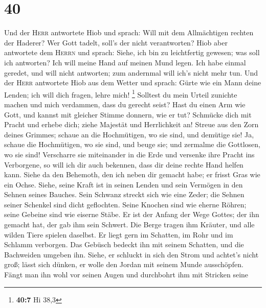 \hypertarget{section-10}{%
\section{40}\label{section-10}}

 Und der \textsc{Herr} antwortete Hiob und sprach:
 Will mit dem Allmächtigen rechten der Haderer? Wer Gott
tadelt, soll's der nicht verantworten?  Hiob aber
antwortete dem \textsc{Herrn} und sprach:  Siehe, ich bin
zu leichtfertig gewesen; was soll ich antworten? Ich will meine Hand auf
meinen Mund legen.  Ich habe einmal geredet, und will
nicht antworten; zum andernmal will ich's nicht mehr tun. 
Und der \textsc{Herr} antwortete Hiob aus dem Wetter und sprach:
 Gürte wie ein Mann deine Lenden; ich will dich fragen,
lehre mich! \footnote{\textbf{40:7} Hi 38,3}  Solltest du
mein Urteil zunichte machen und mich verdammen, dass du gerecht seist?
 Hast du einen Arm wie Gott, und kannst mit gleicher
Stimme donnern, wie er tut?  Schmücke dich mit Pracht und
erhebe dich; ziehe Majestät und Herrlichkeit an!  Streue
aus den Zorn deines Grimmes; schaue an die Hochmütigen, wo sie sind, und
demütige sie!  Ja, schaue die Hochmütigen, wo sie sind,
und beuge sie; und zermalme die Gottlosen, wo sie sind! 
Verscharre sie miteinander in die Erde und versenke ihre Pracht ins
Verborgene,  so will ich dir auch bekennen, dass dir
deine rechte Hand helfen kann.  Siehe da den Behemoth,
den ich neben dir gemacht habe; er frisst Gras wie ein Ochse.
 Siehe, seine Kraft ist in seinen Lenden und sein
Vermögen in den Sehnen seines Bauches.  Sein Schwanz
streckt sich wie eine Zeder; die Sehnen seiner Schenkel sind dicht
geflochten.  Seine Knochen sind wie eherne Röhren; seine
Gebeine sind wie eiserne Stäbe.  Er ist der Anfang der
Wege Gottes; der ihn gemacht hat, der gab ihm sein Schwert.
 Die Berge tragen ihm Kräuter, und alle wilden Tiere
spielen daselbst.  Er liegt gern im Schatten, im Rohr und
im Schlamm verborgen.  Das Gebüsch bedeckt ihn mit seinem
Schatten, und die Bachweiden umgeben ihn.  Siehe, er
schluckt in sich den Strom und achtet's nicht groß; lässt sich dünken,
er wolle den Jordan mit seinem Munde ausschöpfen.  Fängt
man ihn wohl vor seinen Augen und durchbohrt ihm mit Stricken seine
